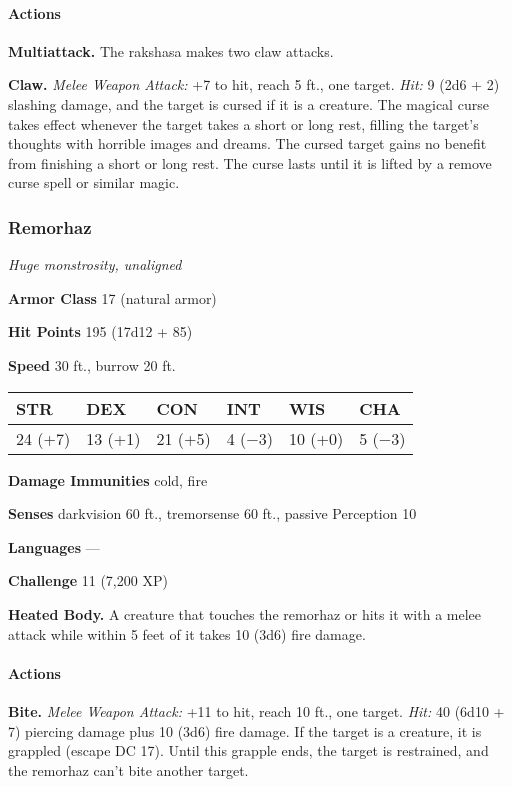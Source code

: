 \documentclass[
]{article}
\begin{document}
\hypertarget{actions}{%
\paragraph{Actions}\label{actions}}

\textbf{Multiattack.} The rakshasa makes two claw attacks.

\textbf{Claw.} \emph{Melee Weapon Attack:} +7 to hit, reach 5 ft., one
target. \emph{Hit:} 9 (2d6 + 2) slashing damage, and the target is
cursed if it is a creature. The magical curse takes effect whenever the
target takes a short or long rest, filling the target's thoughts with
horrible images and dreams. The cursed target gains no benefit from
finishing a short or long rest. The curse lasts until it is lifted by a
remove curse spell or similar magic.

\hypertarget{remorhaz}{%
\subsubsection{Remorhaz}\label{remorhaz}}

\emph{Huge monstrosity, unaligned}

\textbf{Armor Class} 17 (natural armor)

\textbf{Hit Points} 195 (17d12 + 85)

\textbf{Speed} 30 ft., burrow 20 ft.

\begin{longtable}[]{@{}llllll@{}}
\toprule
STR & DEX & CON & INT & WIS & CHA\tabularnewline
\midrule
\endhead
24 (+7) & 13 (+1) & 21 (+5) & 4 (−3) & 10 (+0) & 5 (−3)\tabularnewline
\bottomrule
\end{longtable}

\textbf{Damage Immunities} cold, fire

\textbf{Senses} darkvision 60 ft., tremorsense 60 ft., passive
Perception 10

\textbf{Languages} ---

\textbf{Challenge} 11 (7,200 XP)

\textbf{Heated Body.} A creature that touches the remorhaz or hits it
with a melee attack while within 5 feet of it takes 10 (3d6) fire
damage.

\hypertarget{actions-1}{%
\paragraph{Actions}\label{actions-1}}

\textbf{Bite.} \emph{Melee Weapon Attack:} +11 to hit, reach 10 ft., one
target. \emph{Hit:} 40 (6d10 + 7) piercing damage plus 10 (3d6) fire
damage. If the target is a creature, it is grappled (escape DC 17).
Until this grapple ends, the target is restrained, and the remorhaz
can't bite another target.
\end{document}
